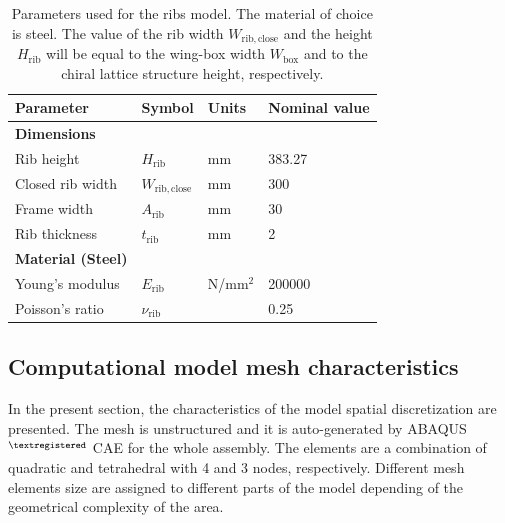     \begin{table}[!htpb]
    \centering
    \begin{tabular}{|l|lll|}
    \hline
    \textbf{Parameter} & \multicolumn{1}{l|}{\textbf{Symbol}} & \multicolumn{1}{l|}{\textbf{Units}} & \textbf{Nominal value} \\ \hline \hline
    {\textbf{Dimensions}} &  &  &  \\ \hline
    Rib height & \multicolumn{1}{l|}{$H_{\mathrm{rib}}$} & \multicolumn{1}{l|}{mm} & 383.27 \\ \hline
    Closed rib width & \multicolumn{1}{l|}{$W_{\mathrm{rib,close}}$} & \multicolumn{1}{l|}{mm} & 300 \\ \hline
    Frame width & \multicolumn{1}{l|}{$A_{\mathrm{rib}}$} & \multicolumn{1}{l|}{mm} & 30 \\ \hline
    Rib thickness & \multicolumn{1}{l|}{$t_{\mathrm{rib}}$} & \multicolumn{1}{l|}{mm} & 2 \\ \hline \hline
    {\textbf{Material (Steel)}} &  &  &  \\ \hline
    Young's modulus & \multicolumn{1}{l|}{$E_{\mathrm{rib}}$} & \multicolumn{1}{l|}{N/mm$^2$} & 200000 \\ \hline
    Poisson's ratio & \multicolumn{1}{l|}{$\nu_{\mathrm{rib}}$} & \multicolumn{1}{l|}{} & 0.25 \\ \hline
    \end{tabular}
    \caption[Parameters used for the ribs model]{Parameters used for the ribs model. The material of choice is steel. The value of the rib width $W_{\mathrm{rib,close}}$ and the height $H_{\mathrm{rib}}$ will be equal to the wing-box width $W_{\mathrm{box}}$ and to the chiral lattice structure height, respectively.}
    \label{tab:parameters_rib}
    \end{table}

  \clearpage
  \subsection{Computational model mesh characteristics} \label{subsec:mesh_computationalModel}

    In the present section, the characteristics of the model spatial discretization are presented. The mesh is unstructured and it is auto-generated by ABAQUS$^{\textregistered}$ CAE for the whole assembly. The elements are a combination of quadratic and tetrahedral with 4 and 3 nodes, respectively. Different mesh elements size are assigned to different parts of the model depending of the geometrical complexity of the area.

